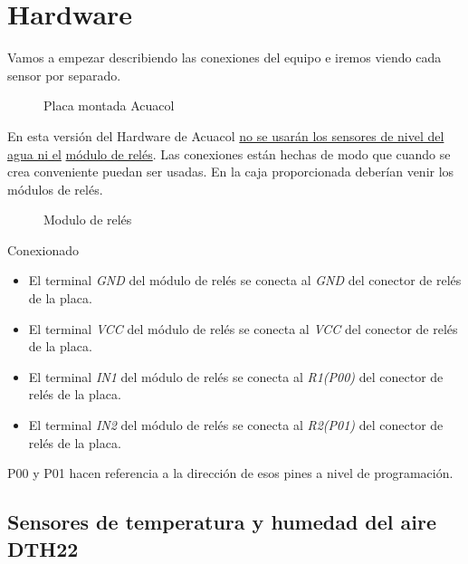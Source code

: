 \newpage

\section {Hardware}

Vamos a empezar describiendo las conexiones del equipo e iremos viendo cada sensor por separado.

\begin{figure}[htbp!]
\caption{Placa montada Acuacol}\label{placa:acuacol}
\end{figure}


En esta versión del Hardware de Acuacol \underline{no se usarán los sensores de nivel del agua ni el} \underline{módulo de relés}. Las conexiones están hechas de modo que cuando se crea conveniente puedan ser usadas. En la caja proporcionada deberían venir los módulos de relés.

\begin{figure}[htbp!]
\caption{Modulo de relés}\label{modulo:reles}
\end{figure}

Conexionado 
\begin{itemize}
\item El terminal \emph{GND} del módulo de relés se conecta al \emph{GND} del conector de relés de la placa.
\item El terminal \emph{VCC} del módulo de relés se conecta al \emph{VCC} del conector de relés de la placa.
\item El terminal \emph{IN1} del módulo de relés se conecta al \emph{R1(P00)} del conector de relés de la placa.
\item El terminal \emph{IN2} del módulo de relés se conecta al \emph{R2(P01)} del conector de relés de la placa.
\end{itemize}

P00 y P01 hacen referencia a la dirección de esos pines a nivel de programación.


\subsection{Sensores de temperatura y humedad del aire DTH22}

